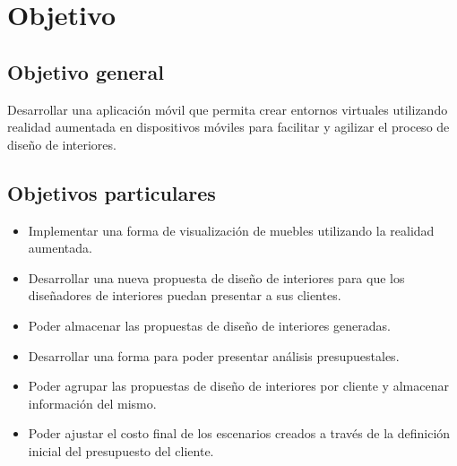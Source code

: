 \section{Objetivo}
\subsection{Objetivo general}
Desarrollar una aplicación móvil que permita crear entornos virtuales utilizando realidad aumentada en dispositivos móviles para facilitar y agilizar el proceso de diseño de interiores.

\subsection{Objetivos particulares}
\begin{itemize}
	\item Implementar una forma de visualización de muebles utilizando la realidad aumentada.
	\item Desarrollar una nueva propuesta de diseño de interiores para que los diseñadores de interiores puedan presentar a sus clientes.
	\item Poder almacenar las propuestas de diseño de interiores generadas.
	\item Desarrollar una forma para poder presentar análisis presupuestales.
	\item Poder agrupar las propuestas de diseño de interiores por cliente y almacenar información del mismo.
	\item Poder ajustar el costo final de los escenarios creados a través de la definición inicial del presupuesto del cliente.
\end{itemize}